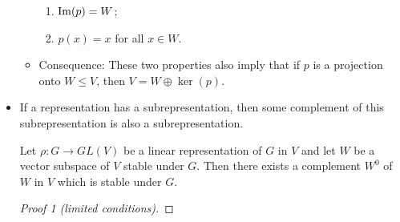 \documentclass[../notes.tex]{subfiles}
\begin{document}
\begin{itemize}
\begin{itemize}
\begin{enumerate}
            \item $\operatorname{Im}(p)=W$;
            \item $p(x)=x$ for all $x\in W$.
        \end{enumerate}
        \item Consequence: These two properties also imply that if $p$ is a projection onto $W\leq V$, then $V=W\oplus\ker(p)$.
    \end{itemize}
    \item If a representation has a subrepresentation, then some complement of this subrepresentation is also a subrepresentation.
    \begin{theorem}\label{trm:complements}
        Let $\rho:G\to GL(V)$ be a linear representation of $G$ in $V$ and let $W$ be a vector subspace of $V$ stable under $G$. Then there exists a complement $W^0$ of $W$ in $V$ which is stable under $G$.
        \begin{proof}[Proof 1 (limited conditions)]


\end{proof}
\end{theorem}
\end{itemize}
\end{document}
